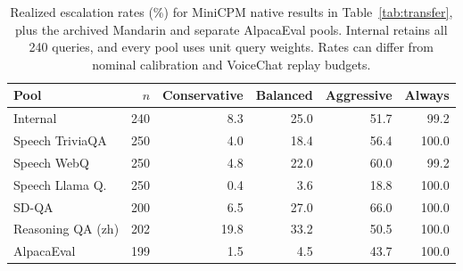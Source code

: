 \begin{table}[h]
\centering\small
\caption{Realized escalation rates (\%) for MiniCPM native results in Table~\ref{tab:transfer}, plus the archived Mandarin and separate AlpacaEval pools. Internal retains all 240 queries, and every pool uses unit query weights. Rates can differ from nominal calibration and VoiceChat replay budgets.}
\label{tab:native-rates}
\begin{tabular}{lrrrrr}
\toprule
Pool & $n$ & Conservative & Balanced & Aggressive & Always \\
\midrule
Internal & 240 & 8.3 & 25.0 & 51.7 & 99.2 \\
Speech TriviaQA & 250 & 4.0 & 18.4 & 56.4 & 100.0 \\
Speech WebQ & 250 & 4.8 & 22.0 & 60.0 & 99.2 \\
Speech Llama Q. & 250 & 0.4 & 3.6 & 18.8 & 100.0 \\
SD-QA & 200 & 6.5 & 27.0 & 66.0 & 100.0 \\
Reasoning QA (zh) & 202 & 19.8 & 33.2 & 50.5 & 100.0 \\
AlpacaEval & 199 & 1.5 & 4.5 & 43.7 & 100.0 \\
\bottomrule
\end{tabular}
\end{table}
